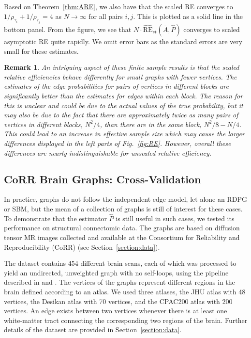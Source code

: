 \documentclass[10pt,letterpaper]{article}
\newtheorem{remark}[fact]{Remark}
\renewcommand{\hat}{\widehat}
\begin{document}
Based on Theorem~\ref{thm:ARE}, we also have that the scaled RE converges to $1/\rho_{\tau_i}+1/\rho_{\tau_j}=4$ as $N\to\infty$ for all pairs $i,j$.
This is plotted as a solid line in the bottom panel.
From the figure, we see that $N \cdot \hat{\mathrm{RE}}_{st}(\bar{A}, \hat{P})$ converges to scaled asymptotic RE quite rapidly.
We omit error bars as the standard errors are very small for these estimates.

\begin{remark}
An intriguing aspect of these finite sample results is that the scaled relative efficiencies behave differently for small graphs with fewer vertices. 
The estimates of the edge probabilities for pairs of vertices in different blocks are significantly better than the estimates for edges within each block.
The reason for this is unclear and could be due to the actual values of the true probability, but it may also be due to the fact that there are approximately twice as many pairs of vertices in different blocks, $N^2/4$, than there are in the same block, $N^2/8-N/4$.
This could lead to an increase in effective sample size which may cause the larger differences displayed in the left parts of Fig.~\ref{fig:RE}.
However, overall these differences are nearly indistinguishable for unscaled relative efficiency.
\end{remark}


\subsection{CoRR Brain Graphs: Cross-Validation}\label{sec:corr_data}
In practice, graphs do not follow the independent edge model, let alone an RDPG or SBM, but the mean of a collection of graphs is still of interest for these cases.
To demonstrate that the estimator $\hat{P}$ is still useful in such cases, we tested its performance on structural connectomic data. 
The graphs are based on diffusion tensor MR images collected and available at the Consortium for Reliability and Reproducibility (CoRR) \cite{zuo2014open, gorgolewski2015high} (see Section~\ref{section:data}).

The dataset contains 454 different brain scans, each of which was processed to yield an undirected, unweighted graph with no self-loops, using the pipeline described in \cite{gray2013migraine} and \cite{kiar2016m2g}.
The vertices of the graphs represent different regions in the brain defined according to an atlas.
We used three atlases, the JHU atlas with 48 vertices, the Desikan atlas with 70 vertices, and the  CPAC200 atlas with 200 vertices.
An edge exists between two vertices whenever there is at least one white-matter tract connecting the corresponding two regions of the brain. 
Further details of the dataset are provided in Section~\ref{section:data}.
\end{document}
